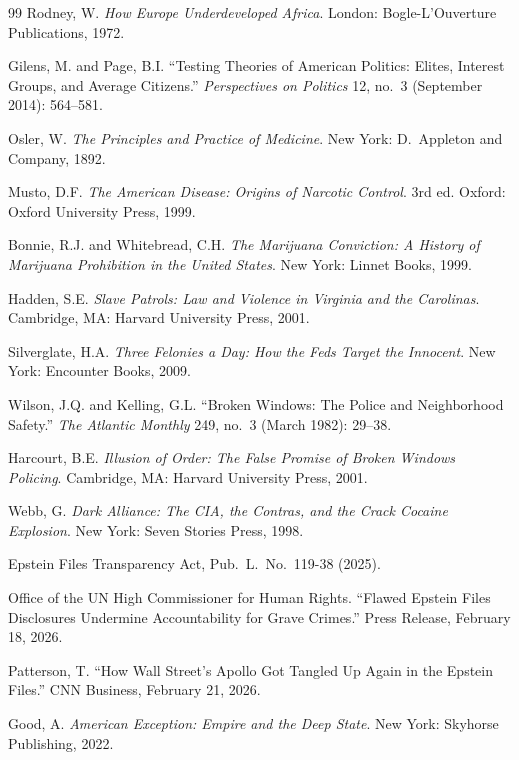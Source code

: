 \documentclass[12pt,openany]{book}
\begin{document}
\begin{thebibliography}{99}
Rodney, W. \textit{How Europe Underdeveloped Africa}. London: Bogle-L'Ouverture Publications, 1972.


Gilens, M. and Page, B.I. ``Testing Theories of American Politics: Elites, Interest Groups, and Average Citizens.'' \textit{Perspectives on Politics} 12, no.\ 3 (September 2014): 564--581.


Osler, W. \textit{The Principles and Practice of Medicine}. New York: D.\ Appleton and Company, 1892.

Musto, D.F. \textit{The American Disease: Origins of Narcotic Control}. 3rd ed. Oxford: Oxford University Press, 1999.

Bonnie, R.J. and Whitebread, C.H. \textit{The Marijuana Conviction: A History of Marijuana Prohibition in the United States}. New York: Linnet Books, 1999.


Hadden, S.E. \textit{Slave Patrols: Law and Violence in Virginia and the Carolinas}. Cambridge, MA: Harvard University Press, 2001.

Silverglate, H.A. \textit{Three Felonies a Day: How the Feds Target the Innocent}. New York: Encounter Books, 2009.

Wilson, J.Q. and Kelling, G.L. ``Broken Windows: The Police and Neighborhood Safety.'' \textit{The Atlantic Monthly} 249, no.\ 3 (March 1982): 29--38.

Harcourt, B.E. \textit{Illusion of Order: The False Promise of Broken Windows Policing}. Cambridge, MA: Harvard University Press, 2001.

Webb, G. \textit{Dark Alliance: The CIA, the Contras, and the Crack Cocaine Explosion}. New York: Seven Stories Press, 1998.


Epstein Files Transparency Act, Pub.\ L.\ No.\ 119-38 (2025).

Office of the UN High Commissioner for Human Rights. ``Flawed Epstein Files Disclosures Undermine Accountability for Grave Crimes.'' Press Release, February 18, 2026.

Patterson, T. ``How Wall Street's Apollo Got Tangled Up Again in the Epstein Files.'' CNN Business, February 21, 2026.


Good, A. \textit{American Exception: Empire and the Deep State}. New York: Skyhorse Publishing, 2022.

\end{thebibliography}
\end{document}
